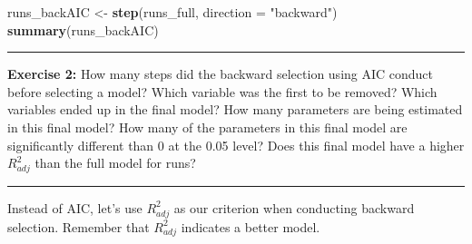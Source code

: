 \documentclass[]{book}
\newenvironment{Shaded}{\begin{snugshade}}{\end{snugshade}}
\newcommand{\KeywordTok}[1]{\textcolor[rgb]{0.13,0.29,0.53}{\textbf{#1}}}
\newcommand{\DataTypeTok}[1]{\textcolor[rgb]{0.13,0.29,0.53}{#1}}
\newcommand{\StringTok}[1]{\textcolor[rgb]{0.31,0.60,0.02}{#1}}
\newcommand{\NormalTok}[1]{#1}
\theoremstyle{definition}
\theoremstyle{definition}
\theoremstyle{definition}
\theoremstyle{remark}
\begin{document}
\begin{Shaded}
\begin{Highlighting}[]
\NormalTok{runs_backAIC <-}\StringTok{ }\KeywordTok{step}\NormalTok{(runs_full, }\DataTypeTok{direction =} \StringTok{"backward"}\NormalTok{)}
\KeywordTok{summary}\NormalTok{(runs_backAIC)}
\end{Highlighting}
\end{Shaded}

\begin{center}\rule{0.5\linewidth}{\linethickness}\end{center}

\textbf{Exercise 2:} How many steps did the backward selection using AIC
conduct before selecting a model? Which variable was the first to be
removed? Which variables ended up in the final model? How many
parameters are being estimated in this final model? How many of the
parameters in this final model are significantly different than 0 at the
0.05 level? Does this final model have a higher \(R^2_{adj}\) than the
full model for runs?

\begin{center}\rule{0.5\linewidth}{\linethickness}\end{center}

Instead of AIC, let's use \(R^2_{adj}\) as our criterion when conducting
backward selection. Remember that \(R^2_{adj}\) indicates a better
model.
\end{document}

